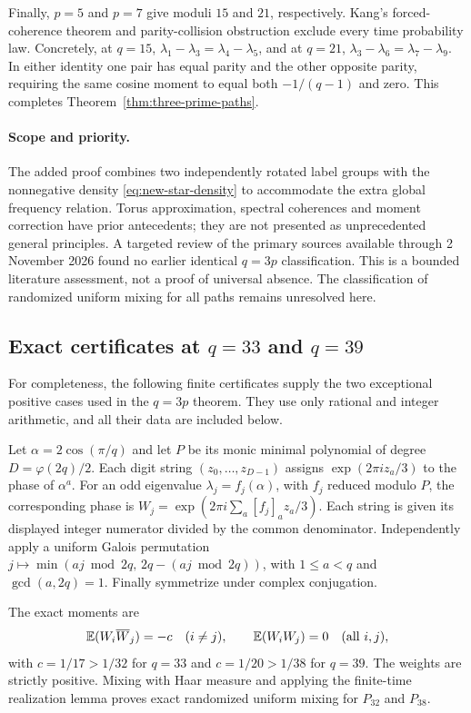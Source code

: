 \documentclass[11pt,a4paper]{article}
\theoremstyle{definition}\newtheorem{definition}[theorem]{Definition}
\theoremstyle{remark}\newtheorem{remark}[theorem]{Remark}
\begin{document}
Finally, $p=5$ and $p=7$ give moduli $15$ and $21$, respectively.
Kang's forced-coherence theorem and parity-collision obstruction
\cite[Theorems S13 and S18]{Kang2026} exclude every time probability
law. Concretely, at $q=15$,
$\lambda_1-\lambda_3=\lambda_4-\lambda_5$, and at $q=21$,
$\lambda_3-\lambda_6=\lambda_7-\lambda_9$.
In either identity one pair has equal parity and the other opposite
parity, requiring the same cosine moment to equal both $-1/(q-1)$
and zero. This completes Theorem~\ref{thm:three-prime-paths}.

\paragraph{Scope and priority.}
The added proof combines two independently rotated label groups with
the nonnegative density \eqref{eq:new-star-density} to accommodate
the extra global frequency relation. Torus approximation, spectral
coherences and moment correction have prior antecedents; they are
not presented as unprecedented general principles. A targeted review
of the primary sources available through 2 November 2026 found no
earlier identical $q=3p$ classification. This is a bounded literature
assessment, not a proof of universal absence. The classification of
randomized uniform mixing for all paths remains unresolved here.


\subsection{Exact certificates at \texorpdfstring{$q=33$ and $q=39$}{q=33 and q=39}}
\label{sec:exact-33-39}
For completeness, the following finite certificates supply the two exceptional
positive cases used in the $q=3p$ theorem. They use only rational and integer
arithmetic, and all their data are included below.

Let $\alpha=2\cos(\pi/q)$ and let $P$ be its monic minimal polynomial of
degree $D=\varphi(2q)/2$. Each digit string $(z_0,\ldots,z_{D-1})$ assigns
$\exp(2\pi i z_a/3)$ to the phase of $\alpha^a$.
For an odd eigenvalue $\lambda_j=f_j(\alpha)$, with $f_j$ reduced modulo $P$,
the corresponding phase is
$W_j=\exp(2\pi i\sum_a[f_j]_a z_a/3)$.
Each string is given its displayed integer numerator divided by the common
denominator. Independently apply a uniform Galois permutation
$j\mapsto \min(aj\bmod 2q,\,2q-(aj\bmod 2q))$, with
$1\leq a<q$ and $\gcd(a,2q)=1$.
Finally symmetrize under complex conjugation.

The exact moments are
\[
 \mathbb E(W_i\overline W_j)=-c\quad(i\ne j),\qquad
 \mathbb E(W_iW_j)=0\quad(\hbox{all }i,j),
\]
with $c=1/17>1/32$ for $q=33$ and $c=1/20>1/38$ for $q=39$.
The weights are strictly positive. Mixing with Haar measure and applying the
finite-time realization lemma proves exact randomized uniform mixing for
$P_{32}$ and $P_{38}$.
\end{document}
